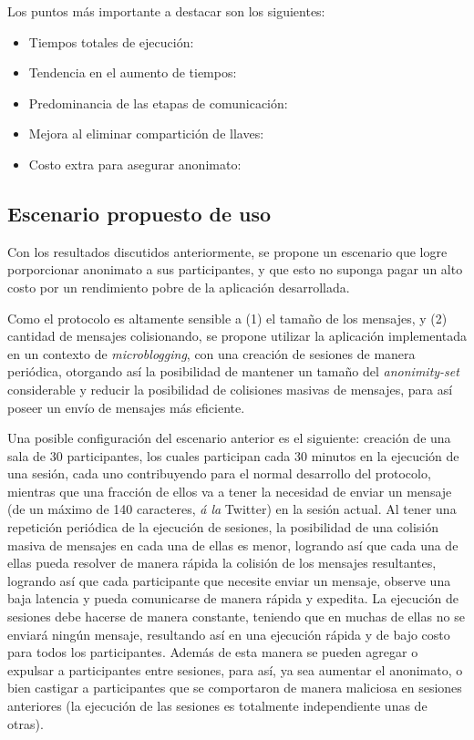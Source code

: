 Los puntos más importante a destacar son los siguientes:

\begin{itemize}
	\item Tiempos totales de ejecución:
	\item Tendencia en el aumento de tiempos:
	\item Predominancia de las etapas de comunicación:
	\item Mejora al eliminar compartición de llaves:
	\item Costo extra para asegurar anonimato:
\end{itemize}

\subsection{Escenario propuesto de uso}

Con los resultados discutidos anteriormente, se propone un escenario que logre 
porporcionar anonimato a sus participantes, y que esto no suponga pagar un alto 
costo por un rendimiento pobre de la aplicación desarrollada.

Como el protocolo es altamente sensible a (1) el tamaño de los mensajes, y (2) cantidad 
de mensajes colisionando, se propone utilizar la aplicación implementada en un contexto 
de \emph{microblogging}, con una creación de sesiones de manera periódica, otorgando 
así la posibilidad de mantener un tamaño del \emph{anonimity-set} considerable y reducir 
la posibilidad de colisiones masivas de mensajes, para así poseer un envío de mensajes 
más eficiente.

Una posible configuración del escenario anterior es el siguiente: creación de una sala 
de 30 participantes, los cuales participan cada 30 minutos en la ejecución de una sesión, 
cada uno contribuyendo para el normal desarrollo del protocolo, mientras que una fracción 
de ellos va a tener la necesidad de enviar un mensaje (de un máximo de 140 caracteres, 
\emph{á la} Twitter) en la sesión actual. Al tener una repetición periódica de la ejecución 
de sesiones, la posibilidad de una colisión masiva de mensajes en cada una de ellas es menor, 
logrando así que cada una de ellas pueda resolver de manera rápida la colisión de los mensajes 
resultantes, logrando así que cada participante que necesite enviar un mensaje, observe una 
baja latencia y pueda comunicarse de manera rápida y expedita. La ejecución de sesiones 
debe hacerse de manera constante, teniendo que en muchas de ellas no se enviará ningún mensaje, 
resultando así en una ejecución rápida y de bajo costo para todos los participantes. Además de esta 
manera se pueden agregar o expulsar a participantes entre sesiones, para así, ya sea aumentar 
el anonimato, o bien castigar a participantes que se comportaron de manera maliciosa en sesiones 
anteriores (la ejecución de las sesiones es totalmente independiente unas de otras).

